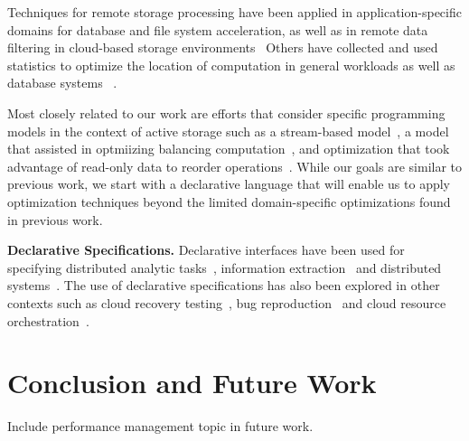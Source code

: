 \documentclass[10pt,twocolumn]{article}
\begin{document}
Techniques for remote storage processing have been applied in
application-specific domains for database and file system acceleration, as
well as in remote data filtering in cloud-based storage
environments~\cite{uysal:hpca00,chiu:iccs03,lim:msst08,gkantsidis:nsdi13}
Others have collected and used statistics to optimize the location of
computation in general workloads as well as database systems
~\cite{chen:cluster12,chen:icpp12,qiao:icde08}.

Most closely related to our work are efforts that consider specific
programming models in the context of active storage such as a stream-based
model~\cite{acharya:asplos98}, a model that assisted in optmiizing balancing
computation~\cite{wickremesinghe:hpdc022}, and optimization that took
advantage of read-only data to reorder operations~\cite{huston:fast04}.
While our goals are similar to previous work, we start with a declarative
language that will enable us to apply optimization techniques beyond
the limited domain-specific optimizations found in previous work.

{\bf Declarative Specifications.}
Declarative interfaces have been used for specifying distributed analytic 
tasks~\cite{olston_pig_2008,thusoo_hive_2010}, information 
extraction~\cite{shen_declarative_2007} and distributed 
systems~\cite{conway_logic_2012,bauer_legion_2014}. The use of declarative 
specifications has also been explored in other contexts such as cloud recovery 
testing~\cite{gunawi_fate_2011}, bug reproduction~\cite{li_reprolite_2014} and 
cloud resource orchestration~\cite{liu_declarative_2011}.

\section{Conclusion and Future Work}

Include performance management topic in future work.



\end{document}
